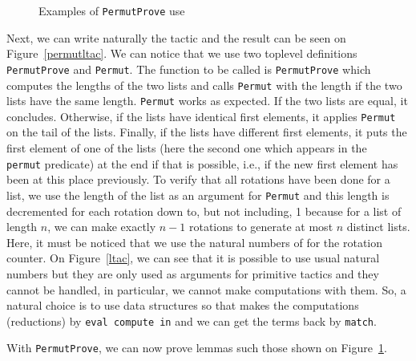 \begin{figure}[p]
\begin{center}
\end{center}
\caption{Examples of {\tt PermutProve} use}
\label{permutlem}
\end{figure}

Next, we can write naturally the tactic and the result can be seen on
Figure~\ref{permutltac}. We can notice that we use two toplevel
definitions {\tt PermutProve} and {\tt Permut}. The function to be
called is {\tt PermutProve} which computes the lengths of the two
lists and calls {\tt Permut} with the length if the two lists have the
same length. {\tt Permut} works as expected.  If the two lists are
equal, it concludes. Otherwise, if the lists have identical first
elements, it applies {\tt Permut} on the tail of the lists.  Finally,
if the lists have different first elements, it puts the first element
of one of the lists (here the second one which appears in the {\tt
  permut} predicate) at the end if that is possible, i.e., if the new
first element has been at this place previously. To verify that all
rotations have been done for a list, we use the length of the list as
an argument for {\tt Permut} and this length is decremented for each
rotation down to, but not including, 1 because for a list of length
$n$, we can make exactly $n-1$ rotations to generate at most $n$
distinct lists. Here, it must be noticed that we use the natural
numbers of {\Coq} for the rotation counter. On Figure~\ref{ltac}, we
can see that it is possible to use usual natural numbers but they are
only used as arguments for primitive tactics and they cannot be
handled, in particular, we cannot make computations with them. So, a
natural choice is to use {\Coq} data structures so that {\Coq} makes
the computations (reductions) by {\tt eval compute in} and we can get
the terms back by {\tt match}.

With {\tt PermutProve}, we can now prove lemmas such those shown on
Figure~\ref{permutlem}.


